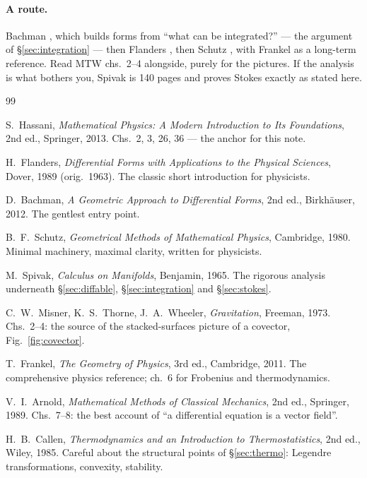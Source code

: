 \documentclass[10pt,a4paper]{article}
\theoremstyle{plain}
\theoremstyle{definition}
\numberwithin{equation}{section}
\begin{document}
\paragraph{A route.} Bachman \cite{Bachman}, which builds forms from ``what can be integrated?''
--- the argument of \S\ref{sec:integration} --- then Flanders \cite{Flanders}, then Schutz
\cite{Schutz}, with Frankel \cite{Frankel} as a long-term reference. Read MTW \cite{MTW}
chs.\ 2--4 alongside, purely for the pictures. If the analysis is what bothers you, Spivak
\cite{Spivak} is 140 pages and proves Stokes exactly as stated here.

\begin{thebibliography}{99}\small

 S.~Hassani, \emph{Mathematical Physics: A Modern Introduction to Its
Foundations}, 2nd ed., Springer, 2013. Chs.\ 2, 3, 26, 36 --- the anchor for this note.

 H.~Flanders, \emph{Differential Forms with Applications to the Physical
Sciences}, Dover, 1989 (orig.\ 1963). The classic short introduction for physicists.

 D.~Bachman, \emph{A Geometric Approach to Differential Forms}, 2nd ed.,
Birkh\"auser, 2012. The gentlest entry point.

 B.~F.~Schutz, \emph{Geometrical Methods of Mathematical Physics}, Cambridge,
1980. Minimal machinery, maximal clarity, written for physicists.

 M.~Spivak, \emph{Calculus on Manifolds}, Benjamin, 1965. The rigorous analysis
underneath \S\ref{sec:diffable}, \S\ref{sec:integration} and \S\ref{sec:stokes}.

 C.~W.~Misner, K.~S.~Thorne, J.~A.~Wheeler, \emph{Gravitation}, Freeman, 1973.
Chs.\ 2--4: the source of the stacked-surfaces picture of a covector, Fig.~\ref{fig:covector}.

 T.~Frankel, \emph{The Geometry of Physics}, 3rd ed., Cambridge, 2011. The
comprehensive physics reference; ch.\ 6 for Frobenius and thermodynamics.

 V.~I.~Arnold, \emph{Mathematical Methods of Classical Mechanics}, 2nd ed.,
Springer, 1989. Chs.\ 7--8: the best account of ``a differential equation is a vector field''.

 H.~B.~Callen, \emph{Thermodynamics and an Introduction to Thermostatistics},
2nd ed., Wiley, 1985. Careful about the structural points of \S\ref{sec:thermo}: Legendre
transformations, convexity, stability.


\end{thebibliography}
\end{document}
